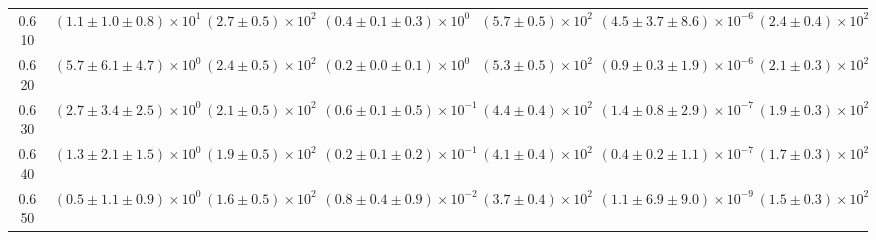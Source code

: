 \begin{center}
\begin{landscape}
\begin{table}[h!]
\begin{tabular}{ccccccc}
0.610 & $\left(1.1 \pm 1.0 \pm 0.8 \right) \times 10^{1}$ & $\left(2.7 \pm 0.5\right) \times 10^{2}$ & $\left(0.4 \pm 0.1 \pm 0.3 \right) \times 10^{0}$ & $\left(5.7 \pm 0.5\right) \times 10^{2}$ & $\left(4.5 \pm 3.7 \pm 8.6 \right) \times 10^{-6}$ & $\left(2.4 \pm 0.4\right) \times 10^{2}$ \\
0.620 & $\left(5.7 \pm 6.1 \pm 4.7 \right) \times 10^{0}$ & $\left(2.4 \pm 0.5\right) \times 10^{2}$ & $\left(0.2 \pm 0.0 \pm 0.1 \right) \times 10^{0}$ & $\left(5.3 \pm 0.5\right) \times 10^{2}$ & $\left(0.9 \pm 0.3 \pm 1.9 \right) \times 10^{-6}$ & $\left(2.1 \pm 0.3\right) \times 10^{2}$ \\
0.630 & $\left(2.7 \pm 3.4 \pm 2.5 \right) \times 10^{0}$ & $\left(2.1 \pm 0.5\right) \times 10^{2}$ & $\left(0.6 \pm 0.1 \pm 0.5 \right) \times 10^{-1}$ & $\left(4.4 \pm 0.4\right) \times 10^{2}$ & $\left(1.4 \pm 0.8 \pm 2.9 \right) \times 10^{-7}$ & $\left(1.9 \pm 0.3\right) \times 10^{2}$ \\
0.640 & $\left(1.3 \pm 2.1 \pm 1.5 \right) \times 10^{0}$ & $\left(1.9 \pm 0.5\right) \times 10^{2}$ & $\left(0.2 \pm 0.1 \pm 0.2 \right) \times 10^{-1}$ & $\left(4.1 \pm 0.4\right) \times 10^{2}$ & $\left(0.4 \pm 0.2 \pm 1.1 \right) \times 10^{-7}$ & $\left(1.7 \pm 0.3\right) \times 10^{2}$ \\
0.650 & $\left(0.5 \pm 1.1 \pm 0.9 \right) \times 10^{0}$ & $\left(1.6 \pm 0.5\right) \times 10^{2}$ & $\left(0.8 \pm 0.4 \pm 0.9 \right) \times 10^{-2}$ & $\left(3.7 \pm 0.4\right) \times 10^{2}$ & $\left(1.1 \pm 6.9 \pm 9.0 \right) \times 10^{-9}$ & $\left(1.5 \pm 0.3\right) \times 10^{2}$ \\
\hline
\end{tabular}
\end{table}

\end{landscape}
\end{center}
